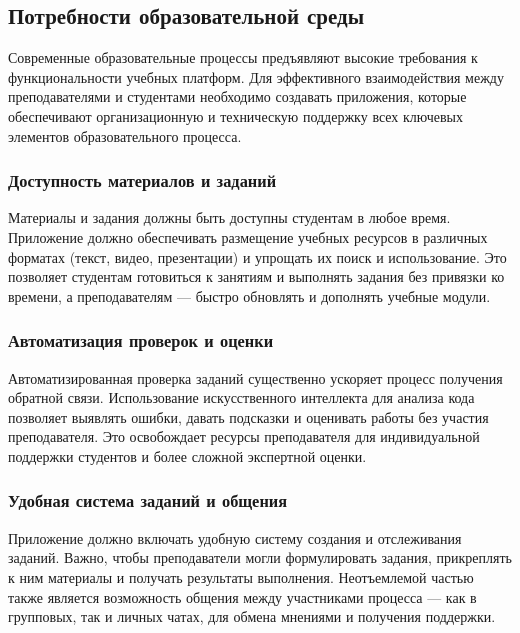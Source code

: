\subsection*{Потребности образовательной среды}

Современные образовательные процессы предъявляют высокие требования к функциональности учебных платформ. Для эффективного взаимодействия между преподавателями и студентами необходимо создавать приложения, которые обеспечивают организационную и техническую поддержку всех ключевых элементов образовательного процесса.

\subsubsection*{Доступность материалов и заданий}
Материалы и задания должны быть доступны студентам в любое время. Приложение должно обеспечивать размещение учебных ресурсов в различных форматах (текст, видео, презентации) и упрощать их поиск и использование. Это позволяет студентам готовиться к занятиям и выполнять задания без привязки ко времени, а преподавателям — быстро обновлять и дополнять учебные модули.

\subsubsection*{Автоматизация проверок и оценки}
Автоматизированная проверка заданий существенно ускоряет процесс получения обратной связи. Использование искусственного интеллекта для анализа кода позволяет выявлять ошибки, давать подсказки и оценивать работы без участия преподавателя. Это освобождает ресурсы преподавателя для индивидуальной поддержки студентов и более сложной экспертной оценки.

\subsubsection*{Удобная система заданий и общения}
Приложение должно включать удобную систему создания и отслеживания заданий. Важно, чтобы преподаватели могли формулировать задания, прикреплять к ним материалы и получать результаты выполнения. Неотъемлемой частью также является возможность общения между участниками процесса — как в групповых, так и личных чатах, для обмена мнениями и получения поддержки.

